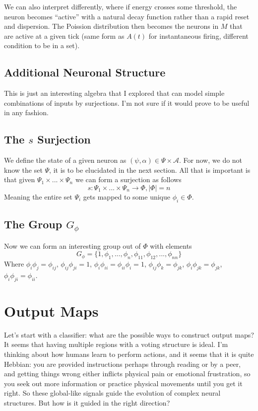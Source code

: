 \documentclass{article}
\begin{document}
We can also interpret differently, where if energy crosses some threshold, the neuron becomes ``active'' with a natural decay function rather than a rapid reset and dispersion. The Poission distribution then becomes the neurons in $M$ that are active at a given tick (same form as $A(t)$ for instantaneous firing, different condition to be in a set).


\subsection{Additional Neuronal Structure}
This is just an interesting algebra that I explored that can model simple combinations of inputs by surjections. I'm not sure if it would prove to be useful in any fashion.
\subsection{The $s$ Surjection}
We define the state of a given neuron as $(\psi, \alpha) \in \Psi \times\mathcal{A}$. For now, we do not know the set $\Psi$, it is to be elucidated in the next section. All that is important is that given $\Psi_1 \times ... \times \Psi_n$ we can form a surjection as follows
\begin{equation}
    s: \Psi_1 \times ...\times \Psi_n \to \Phi, |\Phi| = n
\end{equation}
Meaning the entire set $\Psi_i$ gets mapped to some unique $\phi_i \in \Phi$.

\subsection{The Group $G_\phi$}
Now we can form an interesting group out of $\Phi$ with elements
\begin{equation}
    G_\phi  = \{1, \phi_1,...,\phi_n,\phi_{11},\phi_{12},...,\phi_{nn}\}
\end{equation}
Where $\phi_i\phi_j = \phi_{ij}$, $\phi_{ij}\phi_{ji} = 1$, $\phi_{i}\phi_{ii} = \phi_{ii}\phi_{i} = 1$, $\phi_{ij}\phi_k = \phi_{jk}$, $\phi_i \phi_{jk} = \phi_{jk}$, $\phi_i\phi_{ji}  = \phi_{ii}$. \\



\section{Output Maps}
Let's start with a classifier: what are the possible ways to construct output maps? It seems that having multiple regions with a voting structure is ideal. I'm thinking about how humans learn to perform actions, and it seems that it is quite Hebbian: you are provided instructions perhaps through reading or by a peer, and getting things wrong either inflicts physical pain or emotional frustration, so you seek out more information or practice physical movements until you get it right. So these global-like signals guide the evolution of complex neural structures. But how is it guided in the right direction? \\
\end{document}
